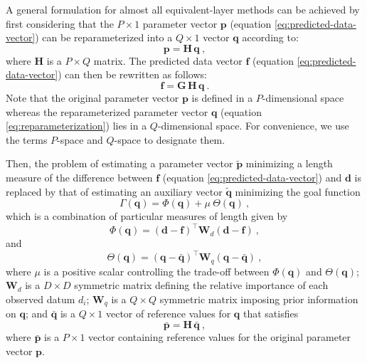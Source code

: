 A general formulation for almost all equivalent-layer methods can be achieved by first considering 
that the $P \times 1$ parameter vector $\mathbf{p}$ (equation \ref{eq:predicted-data-vector}) can be reparameterized 
into a $Q \times 1$ vector $\mathbf{q}$ according to:
\begin{equation}
	\mathbf{p} = \mathbf{H} \, \mathbf{q} \: ,
	\label{eq:reparameterization}
\end{equation}
where $\mathbf{H}$ is a $P \times Q$ matrix.
The predicted data vector $\mathbf{f}$ (equation \ref{eq:predicted-data-vector}) can then be
rewritten as follows:
\begin{equation}
	\mathbf{f} = \mathbf{G} \, \mathbf{H} \, \mathbf{q} \: .
	\label{eq:predicted-data-vetor-reparameterized}
\end{equation}
Note that the original parameter vector $\mathbf{p}$ is defined in a $P$-dimensional space whereas the reparameterized
parameter vector $\mathbf{q}$ (equation \ref{eq:reparameterization}) lies in a $Q$-dimensional space.
For convenience, we use the terms $P$-space and $Q$-space to designate them.

Then, the problem of estimating a parameter vector $\tilde{\mathbf{p}}$ minimizing a length 
measure of the difference between $\mathbf{f}$ (equation \ref{eq:predicted-data-vector}) and $\mathbf{d}$
is replaced by that of estimating an auxiliary vector $\tilde{\mathbf{q}}$ minimizing the goal function
\begin{equation}
	\Gamma(\mathbf{q}) = \Phi(\mathbf{q}) + \mu \: \Theta(\mathbf{q}) \: ,
	\label{eq:function-Gamma}
\end{equation}
which is a combination of particular measures of length given by
\begin{equation}
	\Phi(\mathbf{q}) = \left( \mathbf{d} - \mathbf{f} \right)^{\top}\mathbf{W}_{d}\left( \mathbf{d} - \mathbf{f} \right) \: ,
	\label{eq:function-Phi}
\end{equation}
and
\begin{equation}
	\Theta(\mathbf{q}) = \left( \mathbf{q} - \bar{\mathbf{q}} \right)^{\top}\mathbf{W}_{q}\left( \mathbf{q} - \bar{\mathbf{q}} \right) \: ,
	\label{eq:function-Theta}
\end{equation}
where $\mu$ is a positive scalar controlling the trade-off between $\Phi(\mathbf{q})$ and $\Theta(\mathbf{q})$; 
$\mathbf{W}_{d}$ is a $D \times D$ symmetric matrix defining the relative importance of each observed datum $d_{i}$;
$\mathbf{W}_{q}$ is a $Q \times Q$ symmetric matrix imposing prior information on $\mathbf{q}$;
and $\bar{\mathbf{q}}$ is a $Q \times 1$ vector of reference values for $\mathbf{q}$ that satisfies
\begin{equation}
	\bar{\mathbf{p}} = \mathbf{H} \, \bar{\mathbf{q}} \: ,
	\label{eq:reparameterization-reference}
\end{equation}
where $\bar{\mathbf{p}}$ is a $P \times 1$ vector containing reference values
for the original parameter vector $\mathbf{p}$.

